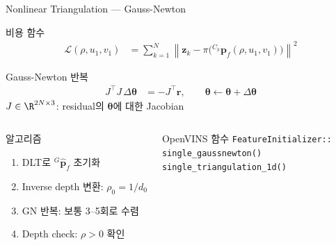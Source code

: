 \begin{frame}[shrink=10]{Nonlinear Triangulation --- Gauss-Newton}
  \begin{block}{비용 함수}
    \begin{align*}
      \mathcal{L}(\rho, u_1, v_1) &= \sum_{k=1}^{N}
        \left\|\bm{z}_k - \pi\!\bigl({}^{C_k}\bm{p}_f(\rho, u_1, v_1)\bigr)\right\|^2
    \end{align*}
  \end{block}
  \begin{block}{Gauss-Newton 반복}
    \begin{align*}
      J^\top J\,\Delta\bm{\theta} &= -J^\top \bm{r}, \qquad
      \bm{\theta} \leftarrow \bm{\theta} + \Delta\bm{\theta}
    \end{align*}
    $J \in \R^{2N\times 3}$: residual의 $\bm{\theta}$에 대한 Jacobian
  \end{block}
  \begin{columns}[T]
      \begin{exampleblock}{알고리즘}
        \begin{enumerate}
          \item DLT로 ${}^G\hat{\bm{p}}_f$ 초기화
          \item Inverse depth 변환: $\rho_0 = 1/d_0$
          \item GN 반복: 보통 3--5회로 수렴
          \item Depth check: $\rho > 0$ 확인
        \end{enumerate}
      \end{exampleblock}
      \begin{exampleblock}{OpenVINS 함수}
        \texttt{FeatureInitializer::}\\
        \texttt{single\_gaussnewton()}\\
        \texttt{single\_triangulation\_1d()}
      \end{exampleblock}
  \end{columns}
\end{frame}


